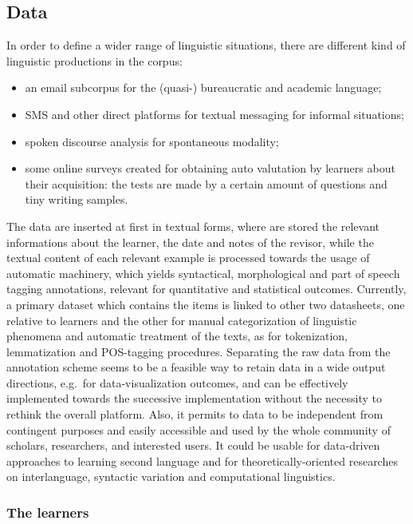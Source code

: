 \documentclass[a4paper,twoside,11pt,chapterprefix=true,listof=totocnumbered,bibliography=totocnumbered]{scrbook}
\providecommand{\tightlist}{%
  \setlength{\itemsep}{0pt}\setlength{\parskip}{0pt}}
\theoremstyle{definition}
\theoremstyle{definition}
\theoremstyle{definition}
\theoremstyle{remark}
\begin{document}
\subsection{Data}\label{data}

In order to define a wider range of linguistic situations, there are
different kind of linguistic productions in the corpus:

\begin{itemize}
\tightlist
\item
  an email subcorpus for the (quasi-) bureaucratic and academic
  language;
\item
  SMS and other direct platforms for textual messaging for informal
  situations;
\item
  spoken discourse analysis for spontaneous modality;
\item
  some online surveys created for obtaining auto valutation by learners
  about their acquisition: the tests are made by a certain amount of
  questions and tiny writing samples.
\end{itemize}

The data are inserted at first in textual forms, where are stored the
relevant informations about the learner, the date and notes of the
revisor, while the textual content of each relevant example is processed
towards the usage of automatic machinery, which yields syntactical,
morphological and part of speech tagging annotations, relevant for
quantitative and statistical outcomes. Currently, a primary dataset
which contains the items is linked to other two datasheets, one relative
to learners and the other for manual categorization of linguistic
phenomena and automatic treatment of the texts, as for tokenization,
lemmatization and POS-tagging procedures. Separating the raw data from
the annotation scheme seems to be a feasible way to retain data in a
wide output directions, e.g.~for data-visualization outcomes, and can be
effectively implemented towards the successive implementation without
the necessity to rethink the overall platform. Also, it permits to data
to be independent from contingent purposes and easily accessible and
used by the whole community of scholars, researchers, and interested
users. It could be usable for data-driven approaches to learning second
language and for theoretically-oriented researches on interlanguage,
syntactic variation and computational linguistics.

\subsubsection{The learners}\label{the-learners}
\end{document}
